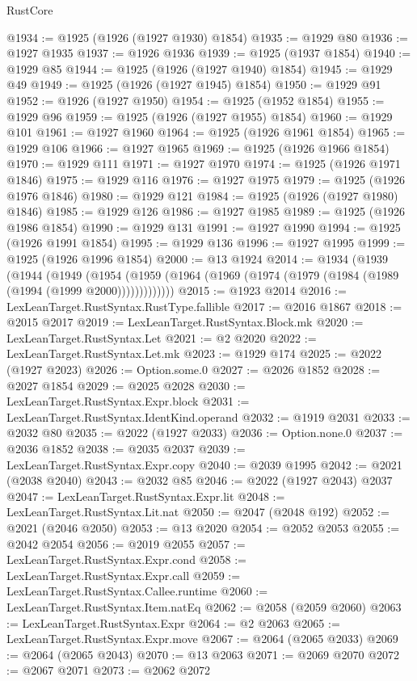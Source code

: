 \begin{lexlean}{RustCore}
\begin{coremodule}
@1934 := @1925 (@1926 (@1927 @1930) @1854)
@1935 := @1929 @80
@1936 := @1927 @1935
@1937 := @1926 @1936
@1939 := @1925 (@1937 @1854)
@1940 := @1929 @85
@1944 := @1925 (@1926 (@1927 @1940) @1854)
@1945 := @1929 @49
@1949 := @1925 (@1926 (@1927 @1945) @1854)
@1950 := @1929 @91
@1952 := @1926 (@1927 @1950)
@1954 := @1925 (@1952 @1854)
@1955 := @1929 @96
@1959 := @1925 (@1926 (@1927 @1955) @1854)
@1960 := @1929 @101
@1961 := @1927 @1960
@1964 := @1925 (@1926 @1961 @1854)
@1965 := @1929 @106
@1966 := @1927 @1965
@1969 := @1925 (@1926 @1966 @1854)
@1970 := @1929 @111
@1971 := @1927 @1970
@1974 := @1925 (@1926 @1971 @1846)
@1975 := @1929 @116
@1976 := @1927 @1975
@1979 := @1925 (@1926 @1976 @1846)
@1980 := @1929 @121
@1984 := @1925 (@1926 (@1927 @1980) @1846)
@1985 := @1929 @126
@1986 := @1927 @1985
@1989 := @1925 (@1926 @1986 @1854)
@1990 := @1929 @131
@1991 := @1927 @1990
@1994 := @1925 (@1926 @1991 @1854)
@1995 := @1929 @136
@1996 := @1927 @1995
@1999 := @1925 (@1926 @1996 @1854)
@2000 := @13 @1924
@2014 := @1934
    (@1939
      (@1944
        (@1949
          (@1954 (@1959 (@1964 (@1969 (@1974 (@1979 (@1984 (@1989 (@1994 (@1999 @2000)))))))))))))
@2015 := @1923 @2014
@2016 := LexLeanTarget.RustSyntax.RustType.fallible
@2017 := @2016 @1867
@2018 := @2015 @2017
@2019 := LexLeanTarget.RustSyntax.Block.mk
@2020 := LexLeanTarget.RustSyntax.Let
@2021 := @2 @2020
@2022 := LexLeanTarget.RustSyntax.Let.mk
@2023 := @1929 @174
@2025 := @2022 (@1927 @2023)
@2026 := Option.some.{0}
@2027 := @2026 @1852
@2028 := @2027 @1854
@2029 := @2025 @2028
@2030 := LexLeanTarget.RustSyntax.Expr.block
@2031 := LexLeanTarget.RustSyntax.IdentKind.operand
@2032 := @1919 @2031
@2033 := @2032 @80
@2035 := @2022 (@1927 @2033)
@2036 := Option.none.{0}
@2037 := @2036 @1852
@2038 := @2035 @2037
@2039 := LexLeanTarget.RustSyntax.Expr.copy
@2040 := @2039 @1995
@2042 := @2021 (@2038 @2040)
@2043 := @2032 @85
@2046 := @2022 (@1927 @2043) @2037
@2047 := LexLeanTarget.RustSyntax.Expr.lit
@2048 := LexLeanTarget.RustSyntax.Lit.nat
@2050 := @2047 (@2048 @192)
@2052 := @2021 (@2046 @2050)
@2053 := @13 @2020
@2054 := @2052 @2053
@2055 := @2042 @2054
@2056 := @2019 @2055
@2057 := LexLeanTarget.RustSyntax.Expr.cond
@2058 := LexLeanTarget.RustSyntax.Expr.call
@2059 := LexLeanTarget.RustSyntax.Callee.runtime
@2060 := LexLeanTarget.RustSyntax.Item.natEq
@2062 := @2058 (@2059 @2060)
@2063 := LexLeanTarget.RustSyntax.Expr
@2064 := @2 @2063
@2065 := LexLeanTarget.RustSyntax.Expr.move
@2067 := @2064 (@2065 @2033)
@2069 := @2064 (@2065 @2043)
@2070 := @13 @2063
@2071 := @2069 @2070
@2072 := @2067 @2071
@2073 := @2062 @2072

\end{coremodule}
\end{lexlean}
